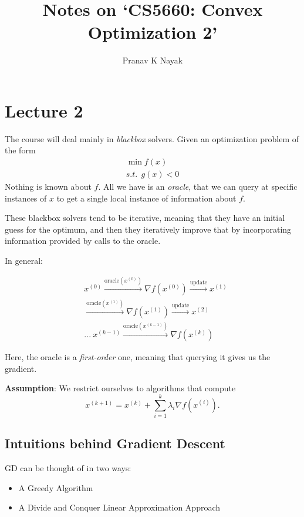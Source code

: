 \documentclass[twocolumn, 11pt]{article}
\title{Notes on `CS5660: Convex Optimization 2'}
\author{Pranav K Nayak}
\date{}
\begin{document}
 \maketitle 
 \section*{Lecture 2 }

 The course will deal mainly in \textit{blackbox} solvers. Given an optimization problem of the form
 \begin{gather*}
  \min f(x) \\
  s.t. ~ ~ g(x) < 0
 \end{gather*}
Nothing is known about $f$. All we have is an \textit{oracle}, that we can query at specific instances of $x$ to get a single local instance of information about $f$.


These blackbox solvers tend to be iterative, meaning that they have an initial guess for the optimum, and then they iteratively improve that by incorporating information provided by calls to the oracle.


In general:

\begin{align*}
  &x^{(0)} \xrightarrow{\text{oracle}(x^{(0)})} \nabla f(x^{(0)}) \xrightarrow{\text{update}} x^{(1)} \\ 
  &\xrightarrow{\text{oracle}(x^{(1)})} \nabla f(x^{(1)}) \xrightarrow{\text{update}} x^{(2)}\\ 
  &...~ x^{(k-1)} \xrightarrow{\text{oracle}(x^{(k-1)})} \nabla{f(x^{(k)})}
\end{align*}
  

Here, the oracle is a \textit{first-order} one, meaning that querying it gives us the gradient. 

\textbf{Assumption}: We restrict ourselves to algorithms that compute 
\[ 
  x^{(k+1)} = x^{(k)} + \sum\limits_{i = 1}^{k} \lambda_i \nabla f(x^{(i)})
.\]

\subsection*{Intuitions behind Gradient Descent}
GD can be thought of in two ways:
\begin{itemize}
  
  \item A Greedy Algorithm 
  \item A Divide and Conquer Linear Approximation Approach
\end{itemize}
\end{document}
